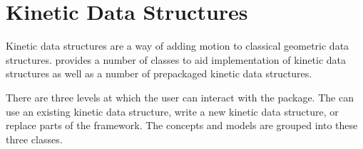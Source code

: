 \chapter{Kinetic Data Structures}
\label{ref-chapter-kds}


Kinetic data structures are a way of adding motion to classical
geometric data structures. \cgal provides a number of classes to aid
implementation of kinetic data structures as well as a number of
prepackaged kinetic data structures.

There are three levels at which the user can interact with the
package. The can use an existing kinetic data structure, write a new
kinetic data structure, or replace parts of the framework. The
concepts and models are grouped into these three classes.

























